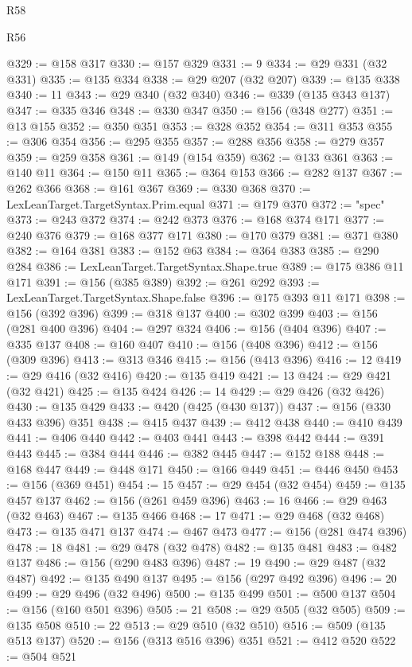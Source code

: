 \begin{lexlean}{R58}
\begin{lexlean}{R56}
\begin{coremodule}
{{{{{{{{{{{{{{{{{{{{{{{{{{{{{{{{{{{{{{{{{{{{{{{{{{{{{{{{{{{{{{{{{{{{{{{{{{{{{{{{{{{{{{{{{{{{{{{{{{{{{{{{{{{{{{{{{{{{{{{{{{{{{{{{{{{{{{{{{{{{{{{{{{{{{{{{{{{{{{{{{{{{{{{{{{{{{{{{{{{{{{{{{{{{{{{{{{{{{{{{{{{{{{{{{{{@329 := @158 @317
@330 := @157 @329
@331 := 9
@334 := @29 @331 (@32 @331)
@335 := @135 @334
@338 := @29 @207 (@32 @207)
@339 := @135 @338
@340 := 11
@343 := @29 @340 (@32 @340)
@346 := @339 (@135 @343 @137)
@347 := @335 @346
@348 := @330 @347
@350 := @156 (@348 @277)
@351 := @13 @155
@352 := @350 @351
@353 := @328 @352
@354 := @311 @353
@355 := @306 @354
@356 := @295 @355
@357 := @288 @356
@358 := @279 @357
@359 := @259 @358
@361 := @149 (@154 @359)
@362 := @133 @361
@363 := @140 @11
@364 := @150 @11
@365 := @364 @153
@366 := @282 @137
@367 := @262 @366
@368 := @161 @367
@369 := @330 @368
@370 := LexLeanTarget.TargetSyntax.Prim.equal
@371 := @179 @370
@372 := "spec"
@373 := @243 @372
@374 := @242 @373
@376 := @168 @374 @171
@377 := @240 @376
@379 := @168 @377 @171
@380 := @170 @379
@381 := @371 @380
@382 := @164 @381
@383 := @152 @63
@384 := @364 @383
@385 := @290 @284
@386 := LexLeanTarget.TargetSyntax.Shape.true
@389 := @175 @386 @11 @171
@391 := @156 (@385 @389)
@392 := @261 @292
@393 := LexLeanTarget.TargetSyntax.Shape.false
@396 := @175 @393 @11 @171
@398 := @156 (@392 @396)
@399 := @318 @137
@400 := @302 @399
@403 := @156 (@281 @400 @396)
@404 := @297 @324
@406 := @156 (@404 @396)
@407 := @335 @137
@408 := @160 @407
@410 := @156 (@408 @396)
@412 := @156 (@309 @396)
@413 := @313 @346
@415 := @156 (@413 @396)
@416 := 12
@419 := @29 @416 (@32 @416)
@420 := @135 @419
@421 := 13
@424 := @29 @421 (@32 @421)
@425 := @135 @424
@426 := 14
@429 := @29 @426 (@32 @426)
@430 := @135 @429
@433 := @420 (@425 (@430 @137))
@437 := @156 (@330 @433 @396) @351
@438 := @415 @437
@439 := @412 @438
@440 := @410 @439
@441 := @406 @440
@442 := @403 @441
@443 := @398 @442
@444 := @391 @443
@445 := @384 @444
@446 := @382 @445
@447 := @152 @188
@448 := @168 @447
@449 := @448 @171
@450 := @166 @449
@451 := @446 @450
@453 := @156 (@369 @451)
@454 := 15
@457 := @29 @454 (@32 @454)
@459 := @135 @457 @137
@462 := @156 (@261 @459 @396)
@463 := 16
@466 := @29 @463 (@32 @463)
@467 := @135 @466
@468 := 17
@471 := @29 @468 (@32 @468)
@473 := @135 @471 @137
@474 := @467 @473
@477 := @156 (@281 @474 @396)
@478 := 18
@481 := @29 @478 (@32 @478)
@482 := @135 @481
@483 := @482 @137
@486 := @156 (@290 @483 @396)
@487 := 19
@490 := @29 @487 (@32 @487)
@492 := @135 @490 @137
@495 := @156 (@297 @492 @396)
@496 := 20
@499 := @29 @496 (@32 @496)
@500 := @135 @499
@501 := @500 @137
@504 := @156 (@160 @501 @396)
@505 := 21
@508 := @29 @505 (@32 @505)
@509 := @135 @508
@510 := 22
@513 := @29 @510 (@32 @510)
@516 := @509 (@135 @513 @137)
@520 := @156 (@313 @516 @396) @351
@521 := @412 @520
@522 := @504 @521
}}}}}}}}}}}}}}}}}}}}}}}}}}}}}}}}}}}}}}}}}}}}}}}}}}}}}}}}}}}}}}}}}}}}}}}}}}}}}}}}}}}}}}}}}}}}}}}}}}}}}}}}}}}}}}}}}}}}}}}}}}}}}}}}}}}}}}}}}}}}}}}}}}}}}}}}}}}}}}}}}}}}}}}}}}}}}}}}}}}}}}}}}}}}}}}}}}}}}}}}}}}}}}}}}}}
\end{coremodule}
\end{lexlean}
\end{lexlean}
